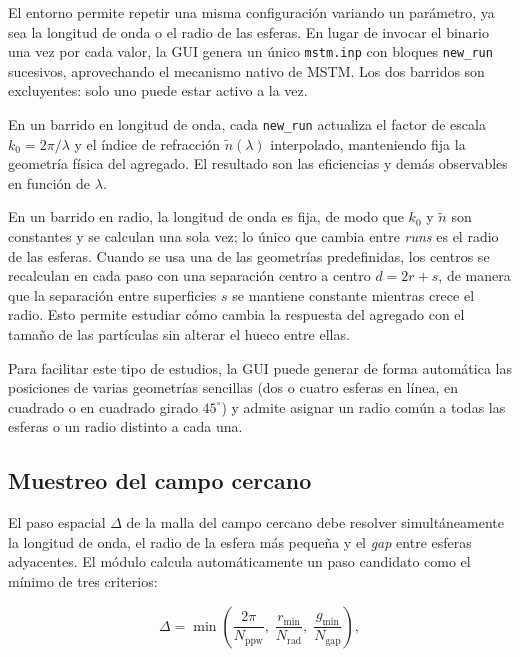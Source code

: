 El entorno permite repetir una misma configuración variando un
parámetro, ya sea la longitud de onda o el radio de las esferas. En
lugar de invocar el binario una vez por cada valor, la GUI genera un
único \texttt{mstm.inp} con bloques \texttt{new\_run} sucesivos,
aprovechando el mecanismo nativo de MSTM. Los dos barridos son
excluyentes: solo uno puede estar activo a la vez.

En un barrido en longitud de onda, cada \texttt{new\_run} actualiza el
factor de escala $k_{0} = 2\pi/\lambda$ y el índice de refracción
$\tilde{n}(\lambda)$ interpolado, manteniendo fija la geometría física
del agregado. El resultado son las eficiencias y demás observables en
función de $\lambda$.

En un barrido en radio, la longitud de onda es fija, de modo que
$k_{0}$ y $\tilde{n}$ son constantes y se calculan una sola vez; lo
único que cambia entre \emph{runs} es el radio de las esferas. Cuando
se usa una de las geometrías predefinidas, los centros se recalculan en
cada paso con una separación centro a centro $d = 2r + s$, de manera
que la separación entre superficies $s$ se mantiene constante mientras
crece el radio. Esto permite estudiar cómo cambia la respuesta del
agregado con el tamaño de las partículas sin alterar el hueco entre
ellas.

Para facilitar este tipo de estudios, la GUI puede generar de forma
automática las posiciones de varias geometrías sencillas (dos o cuatro
esferas en línea, en cuadrado o en cuadrado girado $45^\circ$) y admite
asignar un radio común a todas las esferas o un radio distinto a cada
una.

\subsection{Muestreo del campo cercano}
\label{subsec:adaptive_step}

El paso espacial $\Delta$ de la malla del campo cercano debe resolver
simultáneamente la longitud de onda, el radio de la esfera más pequeña
y el \emph{gap} entre esferas adyacentes. El módulo calcula
automáticamente un paso candidato como el mínimo de tres criterios:

\begin{equation}
    \Delta = \min\!\left(
        \frac{2\pi}{N_{\text{ppw}}},\;
        \frac{r_{\min}}{N_{\text{rad}}},\;
        \frac{g_{\min}}{N_{\text{gap}}}
    \right),
    \label{eq:dmin}
\end{equation}

